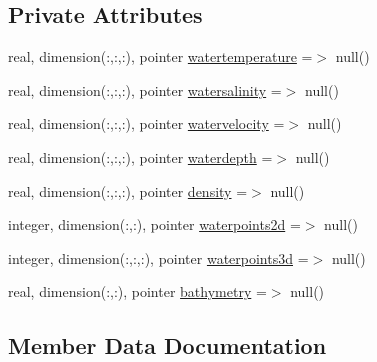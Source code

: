 \subsection*{Private Attributes}
\begin{DoxyCompactItemize}
\item 
real, dimension(\+:,\+:,\+:), pointer \mbox{\hyperlink{structmoduleinterfacewaterair_1_1t__ext__water_a7c41b9771456c90b016762c12447f038}{watertemperature}} =$>$ null()
\item 
real, dimension(\+:,\+:,\+:), pointer \mbox{\hyperlink{structmoduleinterfacewaterair_1_1t__ext__water_a9d2ff60dc34da3b440cf4b278276f6c4}{watersalinity}} =$>$ null()
\item 
real, dimension(\+:,\+:,\+:), pointer \mbox{\hyperlink{structmoduleinterfacewaterair_1_1t__ext__water_acb10dc56aa768ded0b82c0da9e9890b3}{watervelocity}} =$>$ null()
\item 
real, dimension(\+:,\+:,\+:), pointer \mbox{\hyperlink{structmoduleinterfacewaterair_1_1t__ext__water_a39be6fe0787b81374b0f192254f5e6bb}{waterdepth}} =$>$ null()
\item 
real, dimension(\+:,\+:,\+:), pointer \mbox{\hyperlink{structmoduleinterfacewaterair_1_1t__ext__water_a7b4ab4a2d80e118192e3e10d6c0d2a92}{density}} =$>$ null()
\item 
integer, dimension(\+:,\+:), pointer \mbox{\hyperlink{structmoduleinterfacewaterair_1_1t__ext__water_ac323a03fb6869fb3ac6477885a7b1d45}{waterpoints2d}} =$>$ null()
\item 
integer, dimension(\+:,\+:,\+:), pointer \mbox{\hyperlink{structmoduleinterfacewaterair_1_1t__ext__water_ad459347bd0594d008d29a41a167d4129}{waterpoints3d}} =$>$ null()
\item 
real, dimension(\+:,\+:), pointer \mbox{\hyperlink{structmoduleinterfacewaterair_1_1t__ext__water_a4ada32a1e8ea5c7887fcfbc42dbfebce}{bathymetry}} =$>$ null()
\end{DoxyCompactItemize}


\subsection{Member Data Documentation}
\mbox{\label{structmoduleinterfacewaterair_1_1t__ext__water_a4ada32a1e8ea5c7887fcfbc42dbfebce}} 
